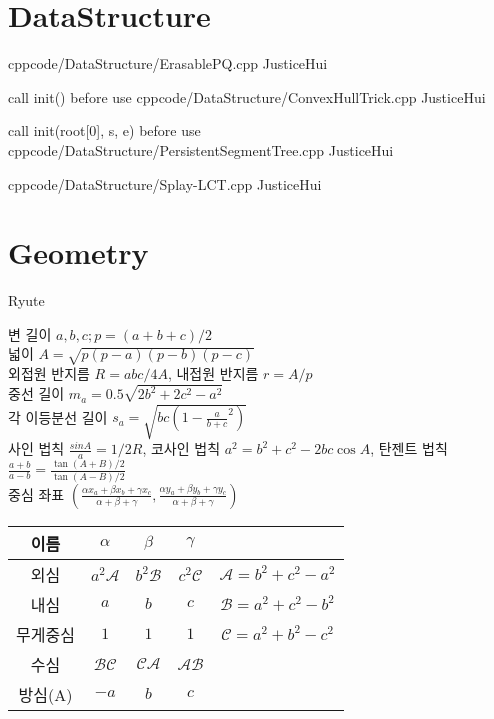 \documentclass[landscape, 8pt, a4paper, oneside, twocolumn]{extarticle}
\begin{document}
\maketitlepage

\pagebreak 

\section{DataStructure}


{}{}
{cpp}{code/DataStructure/ErasablePQ.cpp}
{JusticeHui}

{call init() before use}{}
{cpp}{code/DataStructure/ConvexHullTrick.cpp}
{JusticeHui}

{call init(root[0], s, e) before use}{}
{cpp}{code/DataStructure/PersistentSegmentTree.cpp}
{JusticeHui}

{}{}
{cpp}{code/DataStructure/Splay-LCT.cpp}
{JusticeHui}

\section{Geometry}

{}{}{}{}{Ryute}

변 길이 $a, b, c; p = (a+b+c)/2$ \\
넓이 $A = \sqrt{p(p-a)(p-b)(p-c)}$ \\
외접원 반지름 $R = abc/4A$, 내접원 반지름 $r = A/p$ \\
중선 길이 $m_a = 0.5\sqrt{2b^2 + 2c^2 - a^2}$ \\
각 이등분선 길이 $s_a = \sqrt{bc(1-\frac{a}{b+c}^2)}$ \\
사인 법칙 $\frac{sin A}{a} = 1/2R$, 코사인 법칙 $a^2 = b^2 + c^2 - 2bc\cos A$, 탄젠트 법칙 $\frac{a+b}{a-b} = \frac{\tan (A+B)/2}{\tan (A-B)/2}$ \\
중심 좌표 $(\frac{\alpha x_a + \beta x_b + \gamma x_c}{\alpha+\beta+\gamma}, \frac{\alpha y_a + \beta y_b + \gamma y_c}{\alpha+\beta+\gamma})$ \\

\begin{tabular}{|c|c|c|c|c|}
    이름 & $\alpha$ & $\beta$ & $\gamma$ & \\ \hline
    외심 & $a^2\mathcal{A}$ & $b^2\mathcal{B}$ & $c^2\mathcal{C}$ & $\mathcal{A}=b^2+c^2-a^2$ \\
    내심 & $a$ & $b$ & $c$ & $\mathcal{B} = a^2 + c^2 - b^2$ \\
    무게중심 & $1$ & $1$ & $1$ & $\mathcal{C} = a^2 + b^2 - c^2$ \\
    수심 & $\mathcal{BC}$ & $\mathcal{CA}$ & $\mathcal{AB}$ & \\
    방심(A) & $-a$ & $b$ & $c$ & 
\end{tabular}
\end{document}
